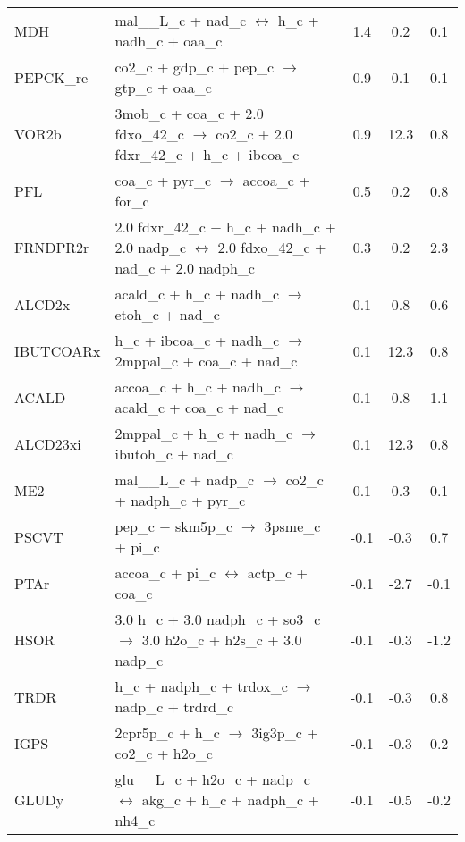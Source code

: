 \tabletail{\hline}
\begin{supertabular}{lp{0.5\textwidth}ccc}
MDH	&	mal\_\_L\_c + nad\_c $\leftrightarrow$ h\_c + nadh\_c + oaa\_c	&	1.4	&	0.2	&	0.1	\\
PEPCK\_re	&	co2\_c + gdp\_c + pep\_c $\rightarrow$ gtp\_c + oaa\_c	&	0.9	&	0.1	&	0.1	\\
VOR2b	&	3mob\_c + coa\_c + 2.0 fdxo\_42\_c $\rightarrow$ co2\_c + 2.0 fdxr\_42\_c + h\_c + ibcoa\_c	&	0.9	&	12.3	&	0.8	\\
PFL	&	coa\_c + pyr\_c $\rightarrow$ accoa\_c + for\_c	&	0.5	&	0.2	&	0.8	\\
FRNDPR2r	&	2.0 fdxr\_42\_c + h\_c + nadh\_c + 2.0 nadp\_c $\leftrightarrow$ 2.0 fdxo\_42\_c + nad\_c + 2.0 nadph\_c	&	0.3	&	0.2	&	2.3	\\
ALCD2x	&	acald\_c + h\_c + nadh\_c $\rightarrow$ etoh\_c + nad\_c	&	0.1	&	0.8	&	0.6	\\
IBUTCOARx	&	h\_c + ibcoa\_c + nadh\_c $\rightarrow$ 2mppal\_c + coa\_c + nad\_c	&	0.1	&	12.3	&	0.8	\\
ACALD	&	accoa\_c + h\_c + nadh\_c $\rightarrow$ acald\_c + coa\_c + nad\_c	&	0.1	&	0.8	&	1.1	\\
ALCD23xi	&	2mppal\_c + h\_c + nadh\_c $\rightarrow$ ibutoh\_c + nad\_c	&	0.1	&	12.3	&	0.8	\\
ME2	&	mal\_\_L\_c + nadp\_c $\rightarrow$ co2\_c + nadph\_c + pyr\_c	&	0.1	&	0.3	&	0.1	\\
PSCVT	&	pep\_c + skm5p\_c $\rightarrow$ 3psme\_c + pi\_c	&	-0.1	&	-0.3	&	0.7	\\
PTAr	&	accoa\_c + pi\_c $\leftrightarrow$ actp\_c + coa\_c	&	-0.1	&	-2.7	&	-0.1	\\
HSOR	&	3.0 h\_c + 3.0 nadph\_c + so3\_c $\rightarrow$ 3.0 h2o\_c + h2s\_c + 3.0 nadp\_c	&	-0.1	&	-0.3	&	-1.2	\\
TRDR	&	h\_c + nadph\_c + trdox\_c $\rightarrow$ nadp\_c + trdrd\_c	&	-0.1	&	-0.3	&	0.8	\\
IGPS	&	2cpr5p\_c + h\_c $\rightarrow$ 3ig3p\_c + co2\_c + h2o\_c	&	-0.1	&	-0.3	&	0.2	\\
GLUDy	&	glu\_\_L\_c + h2o\_c + nadp\_c $\leftrightarrow$ akg\_c + h\_c + nadph\_c + nh4\_c	&	-0.1	&	-0.5	&	-0.2	\\

\end{supertabular}

